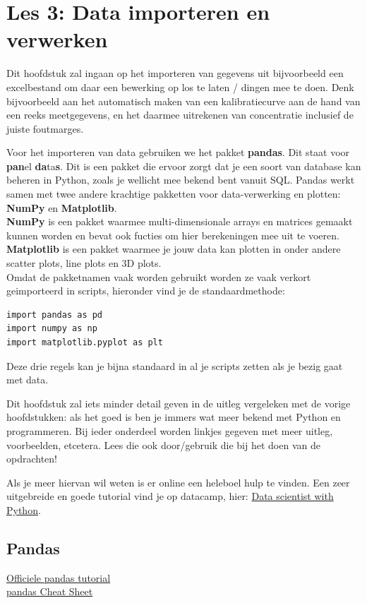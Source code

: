 \chapter{Les 3: Data importeren en verwerken}


Dit hoofdstuk zal ingaan op het importeren van gegevens uit bijvoorbeeld een excelbestand om daar een bewerking op los te laten / dingen mee te doen. Denk bijvoorbeeld aan het automatisch maken van een kalibratiecurve aan de hand van een reeks meetgegevens, en het daarmee uitrekenen van concentratie inclusief de juiste foutmarges.

Voor het importeren van data gebruiken we het pakket \textbf{pandas}. Dit staat voor \textbf{pan}el \textbf{da}ta\textbf{s}. Dit is een pakket die ervoor zorgt dat je een soort van database kan beheren in Python, zoals je wellicht mee bekend bent vanuit SQL. Pandas werkt samen met twee andere krachtige pakketten voor data-verwerking en plotten: \textbf{NumPy} en \textbf{Matplotlib}.\\ \textbf{NumPy} is een pakket waarmee multi-dimensionale arrays en matrices gemaakt kunnen worden en bevat ook fucties om hier berekeningen mee uit te voeren. \\
\textbf{Matplotlib} is een pakket waarmee je jouw data kan plotten in onder andere scatter plots, line plots en 3D plots.
\\ Omdat de pakketnamen vaak worden gebruikt worden ze vaak verkort geimporteerd in scripts, hieronder vind je de standaardmethode:
\begin{lstlisting}[frame=single]
import pandas as pd
import numpy as np
import matplotlib.pyplot as plt
\end{lstlisting}

Deze drie regels kan je bijna standaard in al je scripts zetten als je bezig gaat met data.

Dit hoofdstuk zal iets minder detail geven in de uitleg vergeleken met de vorige hoofdstukken: als het goed is ben je immers wat meer bekend met Python en programmeren. Bij ieder onderdeel worden linkjes gegeven met meer uitleg, voorbeelden, etcetera. Lees die ook door/gebruik die bij het doen van de opdrachten!

Als je meer hiervan wil weten is er online een heleboel hulp te vinden. Een zeer uitgebreide en goede tutorial vind je op datacamp, hier: \href{https://www.datacamp.com/tracks/data-scientist-with-python}{Data scientist with Python}.

\section{Pandas}
\href{http://pandas.pydata.org/pandas-docs/stable/10min.html}{Officiele pandas tutorial}\\
\href{http://pandas.pydata.org/Pandas_Cheat_Sheet.pdf}{pandas Cheat Sheet}

